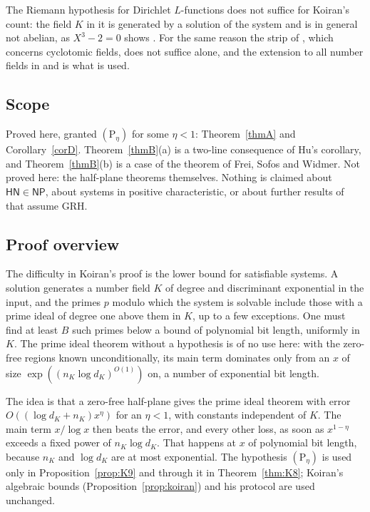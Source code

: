 \documentclass[11pt]{amsart}
\theoremstyle{definition}
\theoremstyle{remark}
\newcommand{\cl}[1]{\mathsf{#1}}
\newcommand{\HN}{\cl{HN}}
\newcommand{\Ph}[1]{(\mathrm P_{#1})}
\begin{document}
The Riemann hypothesis for Dirichlet $L$-functions does not suffice for Koiran's count: the field $K$ in it is generated by a solution of the system and is in general not abelian, as $X^3-2=0$ shows \cite[\S17]{N}. For the same reason the strip of \cite{OAI}, which concerns cyclotomic fields, does not suffice alone, and the extension to all number fields in \cite{CT} and \cite{Hu} is what is used.

\subsection{Scope}
Proved here, granted $\Ph\eta$ for some $\eta<1$: Theorem~\ref{thmA} and Corollary~\ref{corD}. Theorem~\ref{thmB}(a) is a two-line consequence of Hu's corollary, and Theorem~\ref{thmB}(b) is a case of the theorem of Frei, Sofos and Widmer. Not proved here: the half-plane theorems themselves. Nothing is claimed about $\HN\in\cl{NP}$, about systems in positive characteristic, or about further results of \cite{M17} that assume GRH.

\subsection{Proof overview}\label{sec:overview}
The difficulty in Koiran's proof is the lower bound for satisfiable systems. A solution generates a number field $K$ of degree and discriminant exponential in the input, and the primes $p$ modulo which the system is solvable include those with a prime ideal of degree one above them in $K$, up to a few exceptions. One must find at least $B$ such primes below a bound of polynomial bit length, uniformly in $K$. The prime ideal theorem without a hypothesis is of no use here: with the zero-free regions known unconditionally, its main term dominates only from an $x$ of size $\exp((n_K\log d_K)^{O(1)})$ on, a number of exponential bit length.

The idea is that a zero-free half-plane gives the prime ideal theorem with error $O((\log d_K+n_K)x^{\eta})$ for an $\eta<1$, with constants independent of $K$. The main term $x/\log x$ then beats the error, and every other loss, as soon as $x^{1-\eta}$ exceeds a fixed power of $n_K\log d_K$. That happens at $x$ of polynomial bit length, because $n_K$ and $\log d_K$ are at most exponential. The hypothesis $\Ph\eta$ is used only in Proposition~\ref{prop:K9} and through it in Theorem~\ref{thm:K8}; Koiran's algebraic bounds (Proposition~\ref{prop:koiran}) and his protocol are used unchanged.
\end{document}
